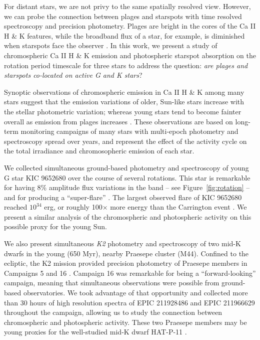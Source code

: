 For distant stars, we are not privy to the same spatially resolved view. However, we can probe the connection between plages and starspots with time resolved spectroscopy and precision photometry. Plages are bright in the cores of the Ca II H \& K features, while the broadband \kepler flux of a star, for example, is diminished when starspots face the observer \citep{Walkowicz2013,McQuillan2013,McQuillan2014,Douglas2014,Douglas2016,Douglas2017}. In this work, we present a study of chromospheric Ca II H \& K emission and photospheric starspot absorption on the rotation period timescale for three stars to address the question: \textit{are plages and starspots co-located on active G and K stars}? 

Synoptic observations of chromospheric emission in Ca II H \& K among many stars suggest that the emission variations of older, Sun-like stars increase with the stellar photometric variation; whereas young stars tend to become fainter overall as emission from plages increases \citep{Radick1998, Radick2018}. These observations are based on long-term monitoring campaigns of many stars with multi-epoch photometry and spectroscopy spread over years, and represent the effect of the activity cycle on the total irradiance and chromosopheric emission of each star. 

We collected simultaneous ground-based photometry and spectroscopy of young G star KIC 9652680 over the course of several rotations. This star is remarkable for having 8\% amplitude flux variations in the \kepler band -- see Figure~\ref{fig:rotation} -- and for producing a ``super-flare'' \citep{Notsu2015a}. The largest observed flare of KIC 9652680 reached $10^{34}$ erg, or roughly 100$\times$ more energy than the Carrington event \citep{Carrington1859, Neuhauser2014, Notsu2015b}. We present a similar analysis of the chromospheric and photospheric activity on this possible proxy for the young Sun. 

We also present simultaneous {\it K2} photometry and spectroscopy of two mid-K dwarfs in the young (650 Myr), nearby Praesepe cluster (M44). Confined to the ecliptic, the K2 mission provided precision photometry of Praesepe members in Campaigns 5 and 16 \citep{k2}. Campaign 16 was remarkable for being a ``forward-looking'' campaign, meaning that simultaneous observations were possible from ground-based observatories. We took advantage of that opportunity and collected more than 30 hours of high resolution spectra of EPIC 211928486 and EPIC 211966629 throughout the campaign, allowing us to study the connection between chromospheric and photospheric activity.  These two Praesepe members may be young proxies for the well-studied mid-K dwarf HAT-P-11 \citep{Deming2011, Sanchis-Ojeda2011, Morris2017a, Morris2017b, Morris2018d}.

